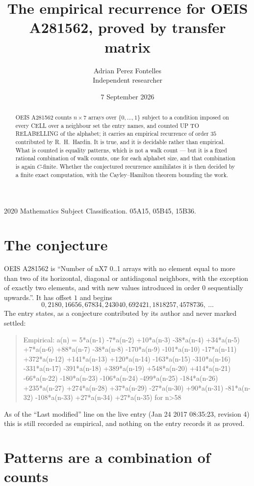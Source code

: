 \documentclass[11pt,a4paper]{article}
\title{The empirical recurrence for OEIS A281562, proved by transfer matrix}
\author{Adrian Perez Fontelles\\ \small Independent researcher}
\date{7 September 2026}
\theoremstyle{plain}
\theoremstyle{definition}
\begin{document}
\maketitle

\begin{abstract}
OEIS A281562 counts $n\times7$ arrays over $\{0,\dots,1\}$ subject to a condition imposed on
every CELL over a neighbour set the entry names, and counted UP TO RELABELLING of the
alphabet; it carries an empirical recurrence of order $35$ contributed by
R.~H.~Hardin. It is true, and it is decidable rather than empirical. What is counted is
equality patterns, which is not a walk count --- but it is a fixed rational combination of
walk counts, one for each alphabet size, and that combination is again $C$-finite. Whether the
conjectured recurrence annihilates it is then decided by a finite exact computation, with the
Cayley--Hamilton theorem bounding the work.
\end{abstract}

\noindent\small 2020 Mathematics Subject Classification. 05A15, 05B45, 15B36.\normalsize

\section{The conjecture}

OEIS A281562 is ``Number of nX7 0..1 arrays with no element equal to more than two of its horizontal, diagonal or antidiagonal neighbors, with the exception of exactly two elements, and with new values introduced in order 0 sequentially upwards.''. It has offset $1$ and begins
\[
0, 2180, 16656, 67834, 243040, 692421, 1818257, 4578736,\ \dots
\]
The entry states, as a conjecture contributed by its author and never marked settled:
\begin{quote}
Empirical: a(n) = 5*a(n-1) -7*a(n-2) +10*a(n-3) -38*a(n-4) +34*a(n-5) +7*a(n-6) +88*a(n-7) -38*a(n-8) -170*a(n-9) -101*a(n-10) -17*a(n-11) +372*a(n-12) +141*a(n-13) +120*a(n-14) -163*a(n-15) -310*a(n-16) -331*a(n-17) -391*a(n-18) +389*a(n-19) +548*a(n-20) +414*a(n-21) -66*a(n-22) -180*a(n-23) -106*a(n-24) -499*a(n-25) -184*a(n-26) +235*a(n-27) +274*a(n-28) +37*a(n-29) -27*a(n-30) +90*a(n-31) -81*a(n-32) -108*a(n-33) +27*a(n-34) +27*a(n-35) for n>58
\end{quote}
As of the ``Last modified'' line on the live entry (Jan 24 2017 08:35:23, revision 4) this is still
recorded as empirical, and nothing on the entry records it as proved.

\section{Patterns are a combination of counts}
\end{document}
